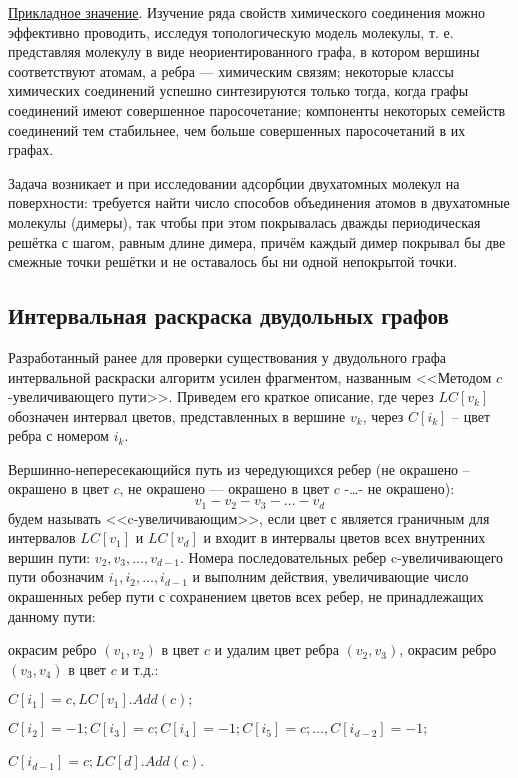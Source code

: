 \underline {Прикладное значение}. Изучение ряда свойств химического соединения можно эффективно проводить, исследуя топологическую модель молекулы, т. е. представляя молекулу в виде неориентированного графа, в котором вершины соответствуют атомам, а ребра — химическим связям;
некоторые классы химических соединений успешно синтезируются только тогда, когда графы соединений имеют совершенное паросочетание;
компоненты некоторых семейств соединений тем стабильнее, чем больше совершенных паросочетаний в их графах.
	
Задача возникает и при исследовании адсорбции двухатомных молекул на поверхности: требуется найти число способов объединения атомов в двухатомные молекулы (димеры), так чтобы при этом покрывалась дважды периодическая решётка с шагом, равным длине димера, причём каждый димер покрывал бы две смежные точки решётки и не оставалось бы ни одной непокрытой точки.


\subsection{Интервальная раскраска двудольных графов}

Разработанный ранее для проверки существования у двудольного графа  интервальной раскраски алгоритм усилен фрагментом, названным
<<Методом $c$-увеличивающего пути>>. Приведем его краткое описание, где через $LC[v_k]$ обозначен интервал цветов, представленных в вершине $v_k$, через $C[i_k]$ -- цвет ребра с номером $i_k$.

Вершинно-непересекающийся путь из чередующихся ребер (не окрашено -- окрашено в цвет $c$, не окрашено --- окрашено в цвет $c$ -…-  не окрашено):
$$v_1-v_2-v_3-\dots-v_d$$
будем называть <<c-увеличивающим>>, если цвет $с$ является граничным для интервалов $LC[v_1]$ и $LC[v_d] $ и входит в интервалы цветов всех внутренних вершин пути: $v_2,v_3, \dots, v_{d-1}$.
Номера последовательных ребер c-увеличивающего пути обозначим $i_1, i_2, \dots, i_{d-1}$ и выполним действия, увеличивающие число окрашенных ребер пути с сохранением цветов всех ребер, не принадлежащих данному пути:

окрасим ребро $(v_1,v_2)$ в цвет $c$ и удалим цвет ребра $(v_2,v_3)$, окрасим ребро $(v_3,v_4)$ в цвет $c$ и т.д.:

$C[i_1 ]=c, LC[v_1].Add(c);$

$C[i_2]=-1; C[i_3]=c; C[i_4 ]=-1; C[i_5 ]=c; \dots ,C[i_{d-2}]=-1;$

$C[i_{d-1}]=c; LC[d].Add(c)$.

